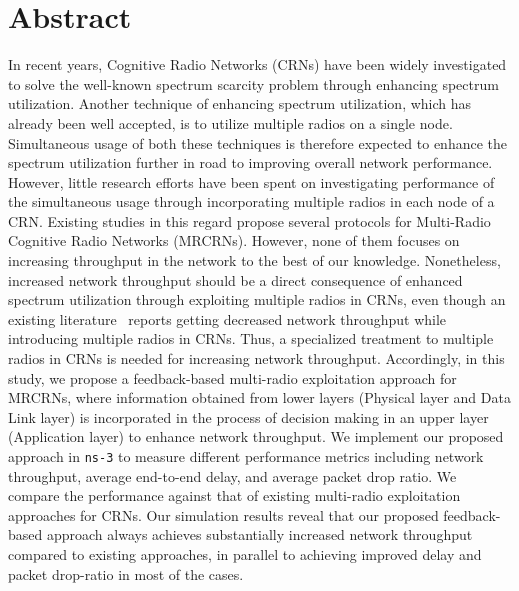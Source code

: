 \chapter*{Abstract}
 In recent years, Cognitive Radio Networks (CRNs) have been widely investigated to solve the well-known spectrum scarcity problem through enhancing spectrum utilization. Another technique of enhancing spectrum utilization, which has already been well accepted, is to utilize multiple radios on a single node. Simultaneous usage of both these techniques is therefore expected to enhance the spectrum utilization further in road to improving overall network performance. However, little research efforts have been spent on investigating performance of the simultaneous usage through incorporating multiple radios in each node of a CRN. Existing studies in this regard propose several protocols for Multi-Radio Cognitive Radio Networks (MRCRNs). However, none of them focuses on increasing throughput in the network to the best of our knowledge. Nonetheless, increased network throughput should be a direct consequence of enhanced spectrum utilization through exploiting multiple radios in CRNs, even though an existing literature~\cite{khan2015towards} reports getting decreased network throughput while introducing multiple radios in CRNs. Thus, a specialized treatment to multiple radios in CRNs is needed for increasing network throughput. Accordingly, in this study, we propose a feedback-based multi-radio exploitation approach for MRCRNs, where information obtained from lower layers (Physical layer and Data Link layer) is incorporated in the process of decision making in an upper layer (Application layer) to enhance network throughput. We implement our proposed approach in \texttt{ns-3} to measure different performance metrics including network throughput, average end-to-end delay, and average packet drop ratio. We compare the performance against that of existing multi-radio exploitation approaches for CRNs. Our simulation results reveal that our proposed feedback-based approach always achieves substantially increased network throughput compared to existing approaches, in parallel to achieving improved delay and packet drop-ratio in most of the cases.
